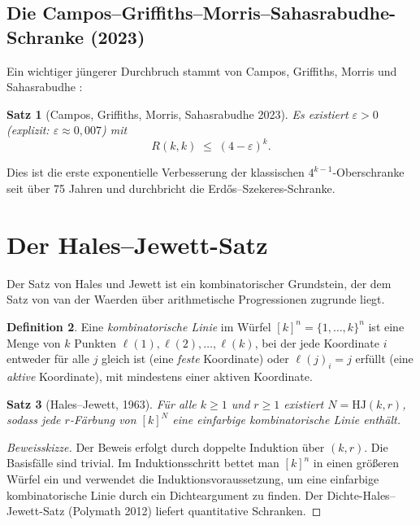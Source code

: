 \documentclass[12pt,a4paper]{amsart}
\newtheorem{theorem}{Satz}[section]
\theoremstyle{definition}
\newtheorem{definition}[theorem]{Definition}
\theoremstyle{remark}
\begin{document}
\subsection{Die Campos--Griffiths--Morris--Sahasrabudhe-Schranke (2023)}

Ein wichtiger jüngerer Durchbruch stammt von Campos, Griffiths, Morris und
Sahasrabudhe \cite{Sah2023}:

\begin{theorem}[Campos, Griffiths, Morris, Sahasrabudhe 2023]
Es existiert $\varepsilon > 0$ (explizit: $\varepsilon \approx 0{,}007$) mit
\[
  R(k,k) \;\le\; (4-\varepsilon)^k.
\]
\end{theorem}

Dies ist die erste exponentielle Verbesserung der klassischen $4^{k-1}$-Oberschranke
seit über 75 Jahren und durchbricht die Erdős--Szekeres-Schranke.

\section{Der Hales--Jewett-Satz}

Der Satz von Hales und Jewett \cite{HalesJewett1963} ist ein kombinatorischer
Grundstein, der dem Satz von van der Waerden \"uber arithmetische Progressionen
zugrunde liegt.

\begin{definition}
Eine \emph{kombinatorische Linie} im W\"urfel $[k]^n = \{1,\ldots,k\}^n$ ist eine
Menge von $k$ Punkten $\ell(1), \ell(2), \ldots, \ell(k)$, bei der jede Koordinate
$i$ entweder f\"ur alle $j$ gleich ist (eine \emph{feste} Koordinate) oder
$\ell(j)_i = j$ erf\"ullt (eine \emph{aktive} Koordinate), mit mindestens einer
aktiven Koordinate.
\end{definition}

\begin{theorem}[Hales--Jewett, 1963]\label{satz:hales-jewett}
F\"ur alle $k \ge 1$ und $r \ge 1$ existiert $N = \mathrm{HJ}(k,r)$, sodass
jede $r$-F\"arbung von $[k]^N$ eine einfarbige kombinatorische Linie enth\"alt.
\end{theorem}

\begin{proof}[Beweisskizze]
Der Beweis erfolgt durch doppelte Induktion \"uber $(k,r)$.  Die Basisf\"alle
sind trivial.  Im Induktionsschritt bettet man $[k]^n$ in einen gr\"o\ss{}eren
W\"urfel ein und verwendet die Induktionsvoraussetzung, um eine einfarbige
kombinatorische Linie durch ein Dichteargument zu finden.  Der Dichte-Hales--Jewett-Satz
(Polymath 2012) liefert quantitative Schranken.
\end{proof}
\end{document}
